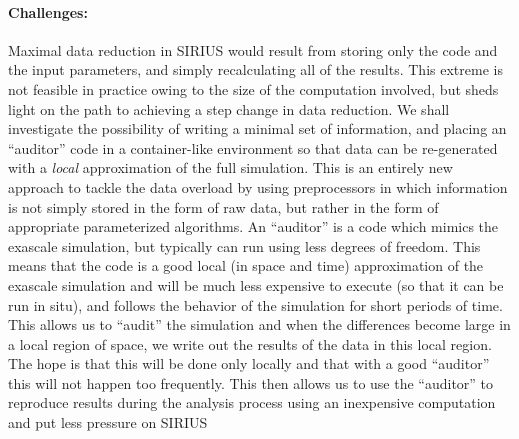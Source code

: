 \paragraph{Challenges:} Maximal data reduction in SIRIUS
would result from storing only the code and the input parameters, and simply
recalculating all of the results. This extreme is not feasible in practice
owing to the size of the computation involved, but sheds light on the path to
achieving a step change in data reduction. We shall investigate the possibility
of writing a minimal set of information, and placing an ``auditor'' code in a
container-like environment so that data can be re-generated with a {\em local}
approximation of the full simulation. This is an entirely new approach to
tackle the data overload by using preprocessors in which information is not
simply stored in the form of raw data, but rather in the form of appropriate
parameterized algorithms. An ``auditor'' is a code which mimics the exascale simulation, 
but typically can run using less degrees of freedom. This means that the code is a good
local (in space and time) approximation of the exascale simulation and will be much less
expensive to execute (so that it can be run in situ), and follows the behavior of the simulation
for short periods of time. This allows us to ``audit'' the simulation and when the differences 
become large in a local region of space, we write out the results of the data in this local region.
The hope is that this will be done only locally and that with a good ``auditor''  this will not happen
too frequently. This then allows us to use the ``auditor'' to reproduce results during the analysis 
process using an inexpensive computation and put less pressure on SIRIUS
%
% 

